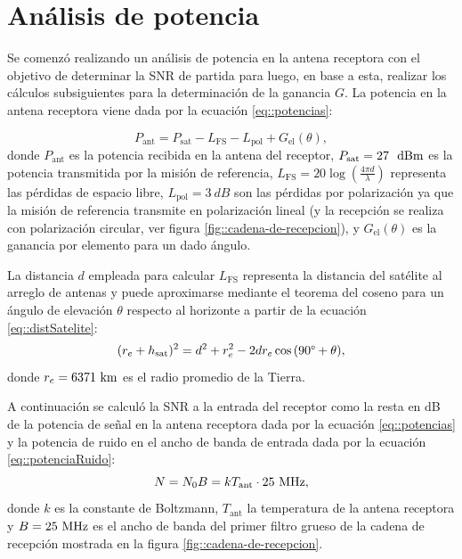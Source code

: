 \documentclass[../../main.tex]{subfiles}
\begin{document}
\section{Análisis de potencia}\label{sec::analisis-potencia}
Se comenzó realizando un análisis de potencia en la antena receptora con el objetivo de determinar la SNR de partida para luego, en base a esta, realizar los cálculos subsiguientes para la determinación de la ganancia $G$. La potencia en la antena receptora viene dada por la ecuación \ref{eq::potencias}:

\begin{equation}
    P_\textrm{ant} = P_\textrm{sat} - L_\textrm{FS} - L_\textrm{pol} + G_\textrm{el} (\theta),
    \label{eq::potencias}
\end{equation}
donde $P_\textrm{ant}$ es la potencia recibida en la antena del receptor, 
$P_\textrm{sat} = 27~~\textrm{dBm}$ es la potencia transmitida por la misión de referencia, $L_\textrm{FS} = 20 \log \left(\frac{4 \pi d}{\lambda}\right)$ representa las pérdidas de espacio libre, $L_\textrm{pol} = 3~dB$
 son las pérdidas por polarización ya que la misión de referencia transmite en polarización lineal (y la recepción se realiza con polarización circular, ver figura \ref{fig::cadena-de-recepcion}), y $G_\textrm{el} (\theta)$ es la ganancia por elemento para un dado ángulo.

La distancia $d$ empleada para calcular $L_\textrm{FS}$ representa la distancia del satélite al arreglo de antenas y puede aproximarse mediante el teorema del coseno para un ángulo de elevación $\theta$ respecto al horizonte a partir de la ecuación \ref{eq::distSatelite}:
\begin{equation}
    (r_e + h_\textrm{sat})^2 = d^2 + r_e^2 - 2 d r_e \cos{(90\degree + \theta)},
    \label{eq::distSatelite}
\end{equation}
donde $r_e = 6371~\textrm{km}$ es el radio promedio de la Tierra.

A continuación se calculó la SNR a la entrada del receptor como la resta en dB de la potencia de señal en la antena receptora dada por la ecuación \ref{eq::potencias} y la potencia de ruido en el ancho de banda de entrada dada por la ecuación \ref{eq::potenciaRuido}:
\begin{equation}
    N = N_0 B = k T_\textrm{ant} \cdot 25~\textrm{MHz},
    \label{eq::potenciaRuido}
\end{equation} 
donde $k$ es la constante de Boltzmann, $T_\textrm{ant}$ la temperatura de la antena receptora y $B = 25~\textrm{MHz}$ es el ancho de banda del primer filtro grueso de la cadena de recepción mostrada en la figura \ref{fig::cadena-de-recepcion}.
\end{document}
